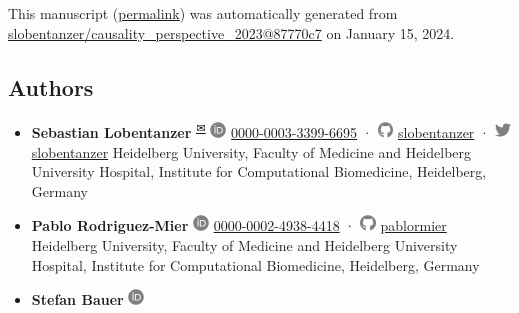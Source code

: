 This manuscript
(\href{https://slobentanzer.github.io/causality_perspective_2023/v/87770c7000b52697503e84194db45aba3c9b0ee1/}{permalink})
was automatically generated
from \href{https://github.com/slobentanzer/causality_perspective_2023/tree/87770c7000b52697503e84194db45aba3c9b0ee1}{slobentanzer/causality\_perspective\_2023@87770c7}
on January 15, 2024.

\hypertarget{authors}{%
\subsection{Authors}\label{authors}}

\begin{itemize}
\item
  \textbf{Sebastian Lobentanzer}
  \textsuperscript{\protect\hyperlink{correspondence}{✉}}
  \includegraphics[width=0.16667in,height=0.16667in]{images/orcid.svg}
  \href{https://orcid.org/0000-0003-3399-6695}{0000-0003-3399-6695}
  · \includegraphics[width=0.16667in,height=0.16667in]{images/github.svg}
  \href{https://github.com/slobentanzer}{slobentanzer}
  · \includegraphics[width=0.16667in,height=0.16667in]{images/twitter.svg}
  \href{https://twitter.com/slobentanzer}{slobentanzer}
  Heidelberg University, Faculty of Medicine and Heidelberg University Hospital, Institute for Computational Biomedicine, Heidelberg, Germany
\item
  \textbf{Pablo Rodriguez-Mier}
  \includegraphics[width=0.16667in,height=0.16667in]{images/orcid.svg}
  \href{https://orcid.org/0000-0002-4938-4418}{0000-0002-4938-4418}
  · \includegraphics[width=0.16667in,height=0.16667in]{images/github.svg}
  \href{https://github.com/pablormier}{pablormier}
  Heidelberg University, Faculty of Medicine and Heidelberg University Hospital, Institute for Computational Biomedicine, Heidelberg, Germany
\item
  \textbf{Stefan Bauer}
  \includegraphics[width=0.16667in,height=0.16667in]{images/orcid.svg}

\end{itemize}
